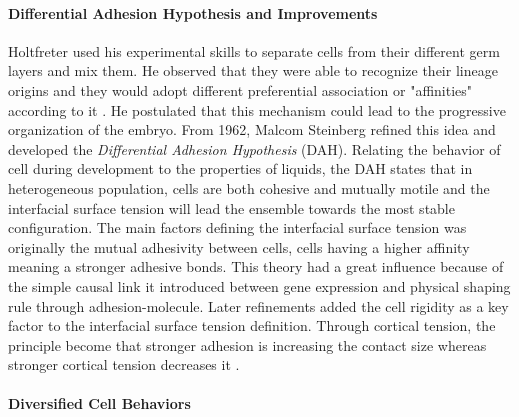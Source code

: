 \paragraph{Differential Adhesion Hypothesis and Improvements}


  Holtfreter used his experimental skills to separate cells from their different germ layers and mix them. He observed that they were able to recognize their lineage origins and they would adopt different preferential association or "affinities" according to it \cite{Holtfreter:1939wb}. He postulated that this mechanism could lead to the progressive organization of the embryo. From 1962, Malcom Steinberg refined this idea and developed the \textit{Differential Adhesion Hypothesis} (DAH)\cite{Steinberg:1962ww}\cite{Steinberg:1963tu}\cite{Steinberg:1970bq}. Relating the behavior of cell during development to the properties of liquids, the DAH states that in heterogeneous population, cells are both cohesive and mutually motile and the interfacial surface tension will lead the ensemble towards the most stable configuration. The main factors defining the interfacial surface tension was originally the mutual adhesivity between cells, cells having a higher affinity meaning a stronger adhesive bonds. This theory had a great influence because of the simple causal link it introduced between gene expression and physical shaping rule through adhesion-molecule. Later refinements added the cell rigidity as a key factor to the interfacial surface tension definition. Through cortical tension, the principle become that stronger adhesion is increasing the contact size whereas stronger cortical tension decreases it \cite{Lecuit:2007cw}\cite{Kafer:2007do}\cite{Manning:2010ce}\cite{Maitre:2012cm}. 

\paragraph{Diversified Cell Behaviors}


